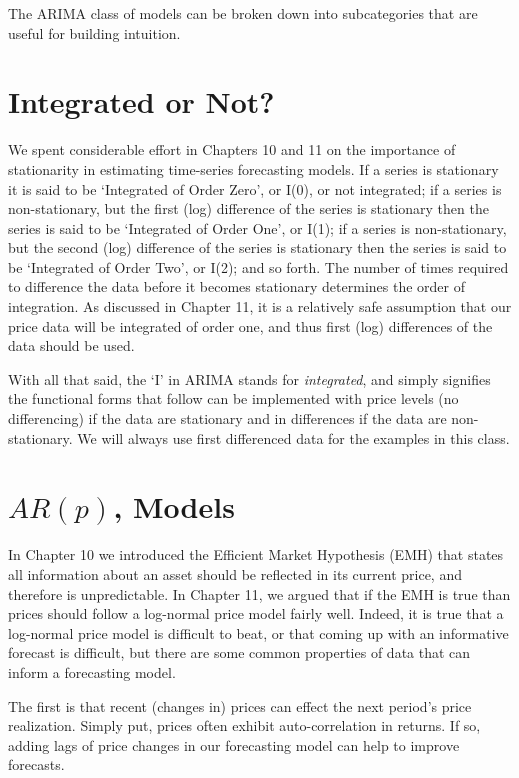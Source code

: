 \documentclass[
  letterpaper,
  DIV=11,
  numbers=noendperiod]{scrreprt}
\begin{document}
The ARIMA class of models can be broken down into subcategories that are
useful for building intuition.

\hypertarget{integrated-or-not}{%
\section{Integrated or Not?}\label{integrated-or-not}}

We spent considerable effort in Chapters 10 and 11 on the importance of
stationarity in estimating time-series forecasting models. If a series
is stationary it is said to be `Integrated of Order Zero', or I(0), or
not integrated; if a series is non-stationary, but the first (log)
difference of the series is stationary then the series is said to be
`Integrated of Order One', or I(1); if a series is non-stationary, but
the second (log) difference of the series is stationary then the series
is said to be `Integrated of Order Two', or I(2); and so forth. The
number of times required to difference the data before it becomes
stationary determines the order of integration. As discussed in Chapter
11, it is a relatively safe assumption that our price data will be
integrated of order one, and thus first (log) differences of the data
should be used.

With all that said, the `I' in ARIMA stands for \emph{integrated}, and
simply signifies the functional forms that follow can be implemented
with price levels (no differencing) if the data are stationary and in
differences if the data are non-stationary. We will always use first
differenced data for the examples in this class.

\hypertarget{arp-models}{%
\section{\texorpdfstring{\(AR(p)\),
Models}{AR(p), Models}}\label{arp-models}}

In Chapter 10 we introduced the Efficient Market Hypothesis (EMH) that
states all information about an asset should be reflected in its current
price, and therefore is unpredictable. In Chapter 11, we argued that if
the EMH is true than prices should follow a log-normal price model
fairly well. Indeed, it is true that a log-normal price model is
difficult to beat, or that coming up with an informative forecast is
difficult, but there are some common properties of data that can inform
a forecasting model.

The first is that recent (changes in) prices can effect the next
period's price realization. Simply put, prices often exhibit
auto-correlation in returns. If so, adding lags of price changes in our
forecasting model can help to improve forecasts.
\end{document}
